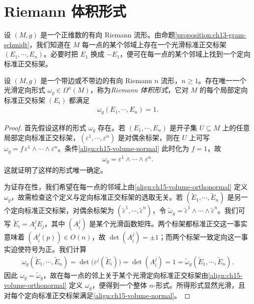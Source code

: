 \documentclass[../../main.tex]{subfiles}
\begin{document}
\section{Riemann 体积形式}\label{section:ch15-volume-form}

设 $(M,g)$ 是一个正维数的有向 Riemann 流形。由命题\ref{proposition:ch13-gram-schmidt}，我们知道在 $M$ 每一点的某个邻域上存在一个光滑标准正交标架 $(E_1,\cdots ,E_n)$。必要时把 $E_1$ 换成 $-E_1$，便可在每一点的某个邻域上找到一个定向标准正交标架。

\begin{proposition}\label{proposition:ch15-volume-form}
设 $(M,g)$ 是一个带边或不带边的有向 Riemann $n$ 流形，$n\geqslant1$。存在唯一一个光滑定向形式 $\omega_g\in\Omega^n(M)$，称为\emph{Riemann 体积形式}，它对 $M$ 的每个局部定向标准正交标架 $(E_i)$ 都满足
\begin{align}
\omega_g(E_1,\cdots ,E_n)=1.\label{align:ch15-volume-normal}
\end{align}
\end{proposition}

\begin{proof}
首先假设这样的形式 $\omega_g$ 存在。若 $(E_1,\cdots ,E_n)$ 是开子集 $U\subseteq M$ 上的任意局部定向标准正交标架，$(\varepsilon^1,\cdots ,\varepsilon^n)$ 是对偶余标架，则在 $U$ 上可写 $\omega_g=f\,\varepsilon^1\wedge\cdots\wedge\varepsilon^n$。条件\eqref{align:ch15-volume-normal} 此时化为 $f=1$，故
\begin{align}
\omega_g=\varepsilon^1\wedge\cdots\wedge\varepsilon^n.\label{align:ch15-volume-orthonormal}
\end{align}
这就证明了这样的形式唯一确定。

为证存在性，我们希望在每一点的邻域上由\eqref{align:ch15-volume-orthonormal} 定义 $\omega_g$，故需检查这个定义与定向标准正交标架的选取无关。若 $(\widetilde E_1,\cdots ,\widetilde E_n)$ 是另一个定向标准正交标架，对偶余标架为 $(\widetilde\varepsilon^1,\cdots ,\widetilde\varepsilon^n)$，令 $\widetilde\omega_g=\widetilde\varepsilon^1\wedge\cdots\wedge\widetilde\varepsilon^n$。我们可写 $\widetilde E_i=A^j_iE_j$，其中 $(A^j_i)$ 是某个光滑函数矩阵。两个标架都标准正交这一事实意味着 $(A^j_i(p))\in O(n)$，故 $\det(A^j_i)=\pm1$；而两个标架一致定向这一事实迫使符号为正。我们计算
\begin{align*}
\omega_g(\widetilde E_1,\cdots ,\widetilde E_n)
=\det\bigl(\varepsilon^j(\widetilde E_i)\bigr)
=\det(A^j_i)=1=\widetilde\omega_g(\widetilde E_1,\cdots ,\widetilde E_n).
\end{align*}
因此 $\omega_g=\widetilde\omega_g$，故在每一点的邻上关于某个光滑定向标准正交标架由\eqref{align:ch15-volume-orthonormal} 定义 $\omega_g$，便得到一个整体 $n$-形式。所得形式显然光滑，且对每个定向标准正交标架满足\eqref{align:ch15-volume-normal}。
\end{proof}
\end{document}
